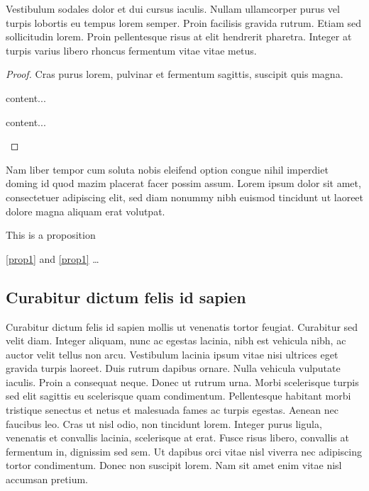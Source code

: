 \documentclass[a4paper,UKenglish,cleveref, autoref]{lipics-v2019}
\begin{document}
\newpage

 

\begin{lemma}
\label{lemma:lorem}
Vestibulum sodales dolor et dui cursus iaculis. Nullam ullamcorper purus vel turpis lobortis eu tempus lorem semper. Proin facilisis gravida rutrum. Etiam sed sollicitudin lorem. Proin pellentesque risus at elit hendrerit pharetra. Integer at turpis varius libero rhoncus fermentum vitae vitae metus.
\end{lemma}

\begin{proof}
Cras purus lorem, pulvinar et fermentum sagittis, suscipit quis magna.

\begin{claim}
content...
\end{claim}
\begin{claimproof}
content...
\end{claimproof}

\end{proof}

\begin{corollary}
\label{lemma:curabitur}
Nam liber tempor cum soluta nobis eleifend option congue nihil imperdiet doming id quod mazim placerat facer possim assum. Lorem ipsum dolor sit amet, consectetuer adipiscing elit, sed diam nonummy nibh euismod tincidunt ut laoreet dolore magna aliquam erat volutpat.
\end{corollary}

\begin{proposition}\label{prop1}
This is a proposition
\end{proposition}

\autoref{prop1} and \cref{prop1} \ldots

\subsection{Curabitur dictum felis id sapien}

Curabitur dictum  felis id sapien mollis ut venenatis tortor feugiat. Curabitur sed velit diam. Integer aliquam, nunc ac egestas lacinia, nibh est vehicula nibh, ac auctor velit tellus non arcu. Vestibulum lacinia ipsum vitae nisi ultrices eget gravida turpis laoreet. Duis rutrum dapibus ornare. Nulla vehicula vulputate iaculis. Proin a consequat neque. Donec ut rutrum urna. Morbi scelerisque turpis sed elit sagittis eu scelerisque quam condimentum. Pellentesque habitant morbi tristique senectus et netus et malesuada fames ac turpis egestas. Aenean nec faucibus leo. Cras ut nisl odio, non tincidunt lorem. Integer purus ligula, venenatis et convallis lacinia, scelerisque at erat. Fusce risus libero, convallis at fermentum in, dignissim sed sem. Ut dapibus orci vitae nisl viverra nec adipiscing tortor condimentum. Donec non suscipit lorem. Nam sit amet enim vitae nisl accumsan pretium. 
\end{document}
